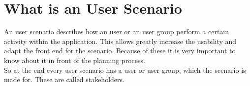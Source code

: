 \section{What is an User Scenario}
An user scenario describes how an user or an user group perform a certain activity within the application. This allows greatly increase the usability and adapt the front end for the scenario. Because of these it is very important to know about it in front of the planning process.
\\[10pt]
So at the end every user scenario has a user or user group, which the scenario is made for. These are called stakeholders.